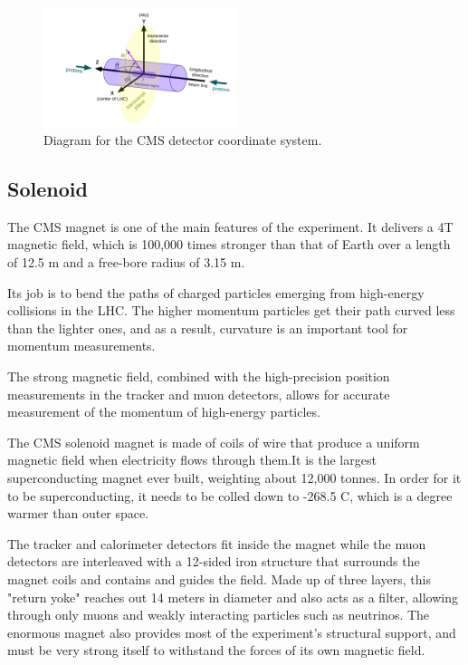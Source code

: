   \begin{figure}[H]
 	\centering
 	\includegraphics[width=0.5\textwidth]{figures/corsyslhc.png}
 	\singlespace
 	\caption{Diagram for the CMS detector coordinate system.}
 	\label{fig:cmscor}
 \end{figure}

 \subsection{Solenoid}

 The CMS magnet\cite{Acquistapace:1997fm} is one of the main features of the experiment. It delivers a 4T magnetic field, which is 100,000 times stronger than that of Earth over a length of 12.5 m and a free-bore radius of 3.15 m.

 Its job is to bend the paths of charged particles emerging from high-energy collisions in the LHC. The higher momentum particles get their path curved less than the lighter ones, and as a result, curvature is an important tool for momentum measurements. 

 The strong magnetic field, combined with the high-precision position measurements in the tracker and muon detectors, allows for accurate measurement of the momentum of high-energy particles.

 The CMS solenoid magnet is made of coils of wire that produce a uniform magnetic field when electricity flows through them.It is the largest superconducting magnet ever built, weighting about 12,000 tonnes. In order for it to be superconducting, it needs to be colled down to -268.5 C, which is a degree warmer than outer space.

 The tracker and calorimeter detectors fit inside the magnet while the muon detectors are interleaved with a 12-sided iron structure that surrounds the magnet coils and contains and guides the field. Made up of three layers, this "return yoke" reaches out 14 meters in diameter and also acts as a filter, allowing through only muons and weakly interacting particles such as neutrinos. The enormous magnet also provides most of the experiment's structural support, and must be very strong itself to withstand the forces of its own magnetic field.


